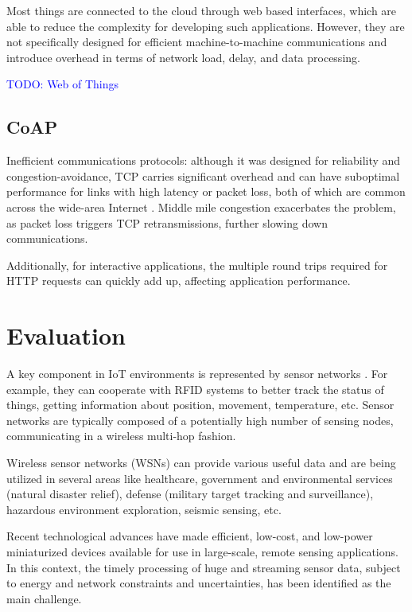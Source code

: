 \documentclass{ieeeaccess}
\begin{document}
Most things are connected to the cloud through web based interfaces, which are able to reduce the complexity for developing such applications. However, they are not specifically designed for efficient machine-to-machine communications and introduce overhead in terms of network load, delay, and data processing.

\textcolor{blue}{TODO: Web of Things}

\subsection{CoAP}

Inefficient communications protocols: although it was designed for reliability and congestion-avoidance, TCP carries significant overhead and can have suboptimal performance for links with high latency or packet loss, both of which are common across the wide-area Internet \cite{akamai}. Middle mile congestion exacerbates the problem, as packet loss triggers TCP retransmissions, further slowing down communications.

Additionally, for interactive applications, the multiple round trips required for HTTP requests can quickly add up, affecting application performance.

\section{Evaluation}
\label{sec:evaluation}

A key component in IoT environments is represented by sensor networks \cite{edge-computing-survey}. For example, they can cooperate with RFID systems to better track the status of things, getting information about position, movement, temperature, etc. Sensor networks are typically composed of a potentially high number of sensing nodes, communicating in a wireless multi-hop fashion.

Wireless sensor networks (WSNs) can provide various useful data and are being utilized in several areas like healthcare, government and environmental services (natural disaster relief), defense (military target tracking and surveillance), hazardous environment exploration, seismic sensing, etc.

Recent technological advances have made efficient, low-cost, and low-power miniaturized devices available for use in large-scale, remote sensing applications. In this context, the timely processing of huge and streaming sensor data, subject to energy and network constraints and uncertainties, has been identified as the main challenge.
\end{document}
